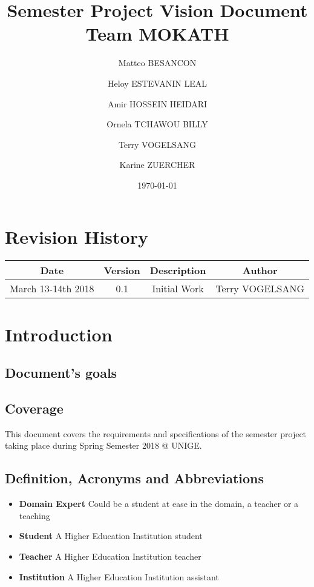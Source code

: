 \documentclass[12pt,a4paper,oneside, titlepage]{article}
\title {Semester Project Vision Document  \\ \large Team MOKATH}
\author{Matteo BESANCON}
\author{Heloy ESTEVANIN LEAL}
\author{Amir HOSSEIN HEIDARI}
\author{Ornela TCHAWOU BILLY}
\author{Terry VOGELSANG}
\author{Karine ZUERCHER}
\affil{Centre Universitaire D'Informatique, University Of Geneva}
\date{\today}
\begin{document}
	\renewcommand{\labelitemi}{$\bullet$}
	\maketitle
	\tableofcontents
	\newpage
	

		\section{Revision History}
		
		\begin{center}
		\def\arraystretch{1.5}
            \begin{tabular}{| c | c | c | c |}
            \hline
            Date & Version & Description & Author \\ \hline
            March 13-14th 2018 & 0.1 & Initial Work  & Terry VOGELSANG \\ \hline
            \end{tabular}
        \end{center}
        
        \newpage
        

	\section{Introduction}
	
		\subsection{Document's goals}
		\subsection{Coverage}
		    This document covers the requirements and specifications of the semester project
		    taking place during Spring Semester 2018 @ UNIGE.
		    
		\subsection{Definition, Acronyms and Abbreviations}
		
		\begin{itemize}
		
		    \item \textbf{Domain Expert} Could be a student at ease in the domain, a teacher or a teaching 
		    \item \textbf{Student} A Higher Education Institution student
		    \item \textbf{Teacher} A Higher Education Institution teacher
		    \item \textbf{Institution} A Higher Education Institution
		    assistant
		    
		\end{itemize}
	
\end{document}
